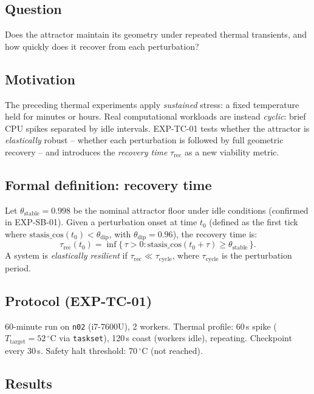 \documentclass[11pt, a4paper]{article}
\begin{document}
\subsection*{Question}
Does the attractor maintain its geometry under repeated thermal transients,
and how quickly does it recover from each perturbation?

\subsection{Motivation}

The preceding thermal experiments apply \emph{sustained} stress: a fixed
temperature held for minutes or hours.  Real computational workloads are
instead \emph{cyclic}: brief CPU spikes separated by idle intervals.
EXP-TC-01 tests whether the attractor is \emph{elastically} robust -- whether
each perturbation is followed by full geometric recovery -- and introduces
the \emph{recovery time} $\tau_\text{rec}$ as a new viability metric.

\subsection{Formal definition: recovery time}

Let $\theta_\text{stable} = 0.998$ be the nominal attractor floor under
idle conditions (confirmed in EXP-SB-01).  Given a perturbation onset at
time $t_0$ (defined as the first tick where
$\text{stasis\_cos}(t_0) < \theta_\text{dip}$, with $\theta_\text{dip} =
0.96$), the recovery time is:
\begin{equation}
  \tau_\text{rec}(t_0) = \inf\{\,\tau > 0 :
    \text{stasis\_cos}(t_0 + \tau) \geq \theta_\text{stable}\,\}.
  \label{eq:tau_rec}
\end{equation}
A system is \emph{elastically resilient} if $\tau_\text{rec} \ll
\tau_\text{cycle}$, where $\tau_\text{cycle}$ is the perturbation period.

\subsection{Protocol (EXP-TC-01)}

60-minute run on \texttt{n02} (i7-7600U), 2 workers.  Thermal profile:
60\,s spike ($T_\text{target}=52\,^\circ$C via \texttt{taskset}), 120\,s
coast (workers idle), repeating.  Checkpoint every 30\,s.
Safety halt threshold: 70\,$^\circ$C (not reached).

\subsection{Results}
\end{document}
